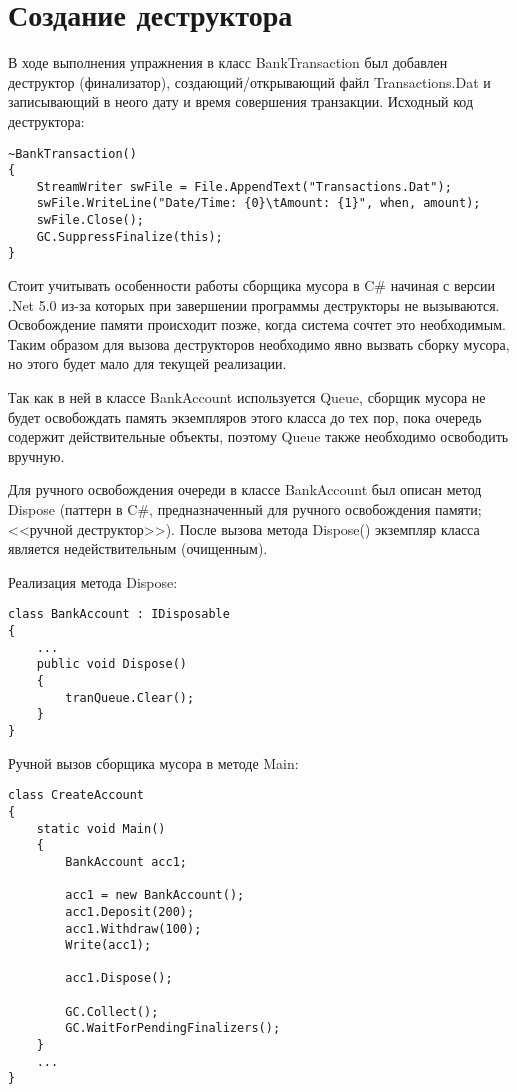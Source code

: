 	\section{Создание деструктора}

    В ходе выполнения упражнения в класс BankTransaction был добавлен деструктор (финализатор), создающий/открывающий файл Transactions.Dat и записывающий в неого дату и время совершения транзакции.
    Исходный код деструктора:

\begin{lstlisting}[style=CSharpStyle]
~BankTransaction()
{
    StreamWriter swFile = File.AppendText("Transactions.Dat");
    swFile.WriteLine("Date/Time: {0}\tAmount: {1}", when, amount);
    swFile.Close();
    GC.SuppressFinalize(this);
}
\end{lstlisting} 

    Стоит учитывать особенности работы сборщика мусора в C\# начиная с версии .Net 5.0 из-за которых при завершении программы деструкторы не вызываются. Освобождение памяти происходит позже, когда система сочтет это необходимым.
    Таким образом для вызова деструкторов необходимо явно вызвать сборку мусора, но этого будет мало для текущей реализации. 

    Так как в ней в классе BankAccount используется Queue, сборщик мусора не будет освобождать память экземпляров этого класса до тех пор, пока очередь содержит действительные объекты, поэтому Queue также необходимо освободить вручную.

    Для ручного освобождения очереди в классе BankAccount был описан метод Dispose (паттерн в C\#, предназначенный для ручного освобождения памяти; <<ручной деструктор>>).
    После вызова метода Dispose() экземпляр класса является недействительным (очищенным).

    Реализация метода Dispose:

\begin{lstlisting}[style=CSharpStyle]
class BankAccount : IDisposable
{
    ...
    public void Dispose()
    {
        tranQueue.Clear();
    }
}
\end{lstlisting}  

    Ручной вызов сборщика мусора в методе Main:

\begin{lstlisting}[style=CSharpStyle]
class CreateAccount
{
    static void Main() 
    {
        BankAccount acc1;

        acc1 = new BankAccount();
        acc1.Deposit(200);
        acc1.Withdraw(100);
        Write(acc1);

        acc1.Dispose();

        GC.Collect();
        GC.WaitForPendingFinalizers();
    }
    ...
}
\end{lstlisting}  

